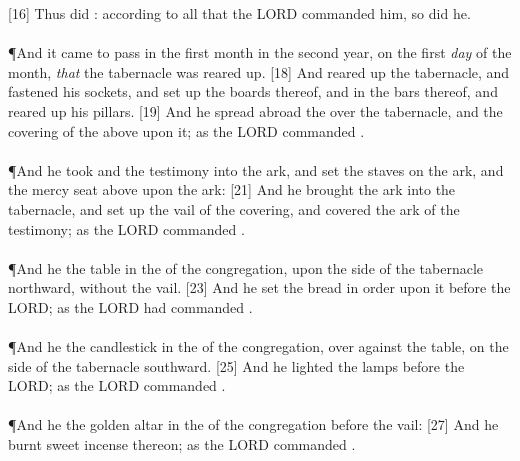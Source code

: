 [16] \textcolor[cmyk]{0.99998,1,0,0}{Thus did : according to all that the LORD commanded him, so did he.}\\
\\
\P \textcolor[cmyk]{0.99998,1,0,0}{And it came to pass in the first month in the second year, on the first \emph{day} of the month, \emph{that} the tabernacle was reared up.}
[18] \textcolor[cmyk]{0.99998,1,0,0}{And  reared up the tabernacle, and fastened his sockets, and set up the boards thereof, and  in the bars thereof, and reared up his pillars.}
[19] \textcolor[cmyk]{0.99998,1,0,0}{And he spread abroad the  over the tabernacle, and  the covering of the  above upon it; as the LORD commanded .}\\
\\
\P \textcolor[cmyk]{0.99998,1,0,0}{And he took and  the testimony into the ark, and set the staves on the ark, and  the mercy seat above upon the ark:}
[21] \textcolor[cmyk]{0.99998,1,0,0}{And he brought the ark into the tabernacle, and set up the vail of the covering, and covered the ark of the testimony; as the LORD commanded .}\\
\\
\P \textcolor[cmyk]{0.99998,1,0,0}{And he  the table in the  of the congregation, upon the side of the tabernacle northward, without the vail.}
[23] \textcolor[cmyk]{0.99998,1,0,0}{And he set the bread in order upon it before the LORD; as the LORD had commanded .}\\
\\
\P \textcolor[cmyk]{0.99998,1,0,0}{And he  the candlestick in the  of the congregation, over against the table, on the side of the tabernacle southward.}
[25] \textcolor[cmyk]{0.99998,1,0,0}{And he lighted the lamps before the LORD; as the LORD commanded .}\\
\\
\P \textcolor[cmyk]{0.99998,1,0,0}{And he  the golden altar in the  of the congregation before the vail:}
[27] \textcolor[cmyk]{0.99998,1,0,0}{And he burnt sweet incense thereon; as the LORD commanded .}\\
